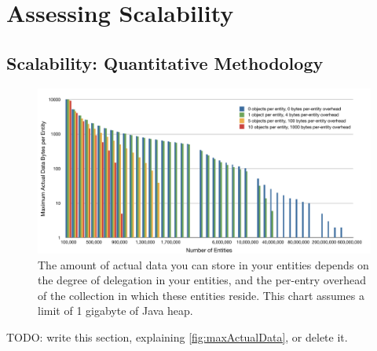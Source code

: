 \chapter{Assessing Scalability}

\section{Scalability: Quantitative Methodology}

\begin{figure}
\centering
	\includegraphics[width=\textwidth]{part3/Figures/assessing/maxActualData}
	\caption{The amount of actual data you can store in your entities depends on
	the degree of delegation in your entities, and the per-entry overhead of the collection in which these entities
	reside. This chart assumes a limit of 1 gigabyte of Java heap.}
	\label{fig:maxActualData}
\end{figure}

TODO: write this section, explaining \autoref{fig:maxActualData}, or delete it.
